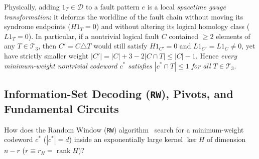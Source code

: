 \documentclass[12pt]{article}
\theoremstyle{definition}
\DeclareMathOperator{\rank}{rank}
\newcommand{\Dc}{\mathcal{D}}
\newcommand{\Tc}{\mathcal{T}_3}
\newcommand{\ttt}[1]{\texttt{#1}}
\begin{document}
Physically, adding $1_T \in \Dc$ to a fault pattern $e$ is a local \emph{spacetime gauge transformation}: it
deforms the worldline of the fault chain without moving its syndrome endpoints ($H 1_T = 0$) and without altering
its logical homology class ($L 1_T = 0$). In particular, if a nontrivial logical fault $C$ contained $\ge 2$
elements of any $T \in \Tc$, then $C' = C \triangle T$ would still satisfy $H 1_{C'} = 0$ and $L 1_{C'} = L 1_C
\neq 0$, yet have strictly smaller weight $|C'| = |C| + 3 - 2|C \cap T| \le |C| - 1$. Hence \emph{every
minimum-weight nontrivial codeword $c^*$ satisfies $|c^* \cap T| \le 1$ for all $T \in \Tc$}.

\subsection{Information-Set Decoding (\texorpdfstring{\ttt{RW}}{RW}), Pivots, and Fundamental
  Circuits}\label{subsec:isd_bg}

How does the Random Window (\ttt{RW}) algorithm~\cite{Prange1962,Leon1988,Stern1988,CanteautChabaud1998,
PryadkoShabashovKozin2022QDistRnd,PryadkoZeng2026DistM4RI} search for a minimum-weight codeword $c^*$ ($|c^*| =
d$) inside an exponentially large kernel $\ker H$ of dimension $n - r$ ($r \equiv r_H = \rank H$)?
\end{document}
